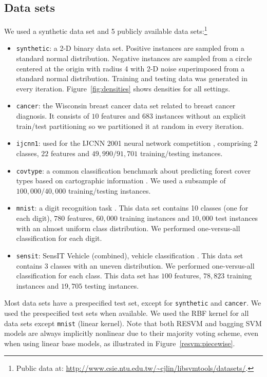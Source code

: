 \subsection{Data sets} \label{resvm:data} 
We used a synthetic data set and 5 publicly available data sets:\footnote{Public data at: \url{http://www.csie.ntu.edu.tw/~cjlin/libsvmtools/datasets/}.}
\begin{itemize}
\item \texttt{synthetic}: a 2-D binary data set. Positive instances are sampled from a standard normal distribution. Negative instances are sampled from a circle centered at the origin with radius 4 with 2-D noise superimposed from a standard normal distribution. Training and testing data was generated in every iteration. Figure~\ref{fig:densities} shows densities for all settings. 
\item \texttt{cancer}: the Wisconsin breast cancer data set related to breast cancer diagnosis. It consists of $10$ features and $683$ instances without an explicit train/test partitioning so we partitioned it at random in every iteration.
\item \texttt{ijcnn1}: used for the IJCNN 2001 neural network competition \citep{prokhorov2001ijcnn}, comprising $2$ classes, $22$ features and $49,990/91,701$ training/testing instances.
\item \texttt{covtype}: a common classification benchmark about predicting forest cover types based on cartographic information \citep{Blackard00covtype}. We used a subsample of $100,000/40,000$ training/testing instances.
\item \texttt{mnist}: a digit recognition task \citep{Lecun98gradient-basedlearning}. This data set contains 10 classes (one for each digit), $780$ features, $60,000$ training instances and $10,000$ test instances with an almost uniform class distribution. We performed one-versus-all classification for each digit.
\item \texttt{sensit}: SensIT Vehicle (combined), vehicle classification \citep{duarte2004vehicle}. This data set contains 3 classes with an uneven distribution. We performed one-versus-all classification for each class. This data set has $100$ features, $78,823$ training instances and $19,705$ testing instances.
\end{itemize}

Most data sets have a prespecified test set, except for \texttt{synthetic} and \texttt{cancer}. We used the prespecified test sets when available. We used the RBF kernel for all data sets except \texttt{mnist} (linear kernel). Note that both RESVM and bagging SVM models are always implicitly nonlinear due to their majority voting scheme, even when using linear base models, as illustrated in Figure~\ref{resvm:piecewise}.

